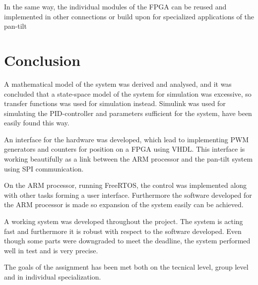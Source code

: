 In the same way, the individual modules of the FPGA can be reused and implemented in other connections or build upon for specialized applications of the pan-tilt



\chapter{Conclusion}\label{chap:conclusion}

A mathematical model of the system was derived and analysed, and it was concluded that a state-space model of the system for simulation was excessive, so transfer functions was used for simulation instead. Simulink was used for simulating the PID-controller and parameters sufficient for the system, have been easily found this way. 



An interface for the hardware was developed, which lead to implementing PWM generators and counters for position on a FPGA using VHDL. This interface is working beautifully as a link between the ARM processor and the pan-tilt system using SPI communication.



On the ARM processor, running FreeRTOS, the control was implemented along with other tasks forming a user interface. Furthermore the software developed for the ARM processor is made so expansion of the system easily can be achieved.



A working system was developed throughout the project. The system is acting fast and furthermore it is robust with respect to the software developed. Even though some parts were downgraded to meet the deadline, the system performed well in test and is very precise.



The goals of the assignment has been met both on the tecnical level, group level and in individual specialization.